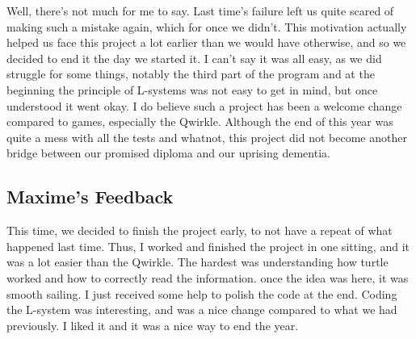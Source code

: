 \documentclass{article}
\begin{document}
Well, there's not much for me to say. Last time's failure left us quite scared of making such a mistake again, which for once we didn't. This motivation actually helped us face this project a lot earlier than we would have otherwise, and so we decided to end it the day we started it. I can't say it was all easy, as we did struggle for some things, notably the third part of the program and at the beginning the principle of L-systems was not easy to get in mind, but once understood it went okay. I do believe such a project has been a welcome change compared to games, especially the Qwirkle. Although the end of this year was quite a mess with all the tests and whatnot, this project did not become another bridge between our promised diploma and our uprising dementia.

\subsection{Maxime's Feedback}
This time, we decided to finish the project early, to not have a repeat of what happened last time. Thus, I worked and finished the project in one sitting, and it was a lot easier than the Qwirkle. The hardest was understanding how turtle worked and how to correctly read the information. once the idea was here, it was smooth sailing. I just received some help to polish the code at the end. Coding the L-system was interesting, and was a nice change compared to what we had previously. I liked it and it was a nice way to end the year.
\end{document}
